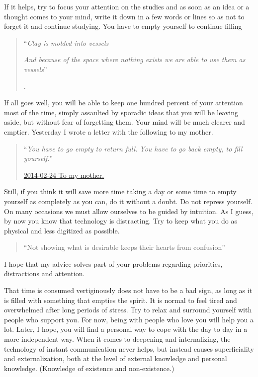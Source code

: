\documentclass[]{book}
\begin{document}
If it helps, try to focus your attention on the studies and as soon as an idea or a thought comes to your mind, write it down in a few words or lines so as not to forget it and continue studying. You have to empty yourself to continue filling

\begin{quote}
``\emph{Clay is molded into vessels}

\emph{And because of the space where nothing exists we are able to use them as vessels}''

\citep{ta1984tao}.
\end{quote}

If all goes well, you will be able to keep one hundred percent of your attention most of the time, simply assaulted by sporadic ideas that you will be leaving aside, but without fear of forgetting them. Your mind will be much clearer and emptier. Yesterday I wrote a letter with the following to my mother.

\begin{quote}
``\emph{You have to go empty to return full. You have to go back empty, to fill yourself.}''

\protect\hyperlink{tomother20140224}{2014-02-24 To my mother.}
\end{quote}

Still, if you think it will save more time taking a day or some time to empty yourself as completely as you can, do it without a doubt. Do not repress yourself. On many occasions we must allow ourselves to be guided by intuition. As I guess, by now you know that technology is distracting. Try to keep what you do as physical and less digitized as possible.

\begin{quote}
``Not showing what is desirable keeps their hearts from confusion''

\citep{ta1984tao}
\end{quote}

I hope that my advice solves part of your problems regarding priorities, distractions and attention.

That time is consumed vertiginously does not have to be a bad sign, as long as it is filled with something that empties the spirit. It is normal to feel tired and overwhelmed after long periods of stress. Try to relax and surround yourself with people who support you. For now, being with people who love you will help you a lot. Later, I hope, you will find a personal way to cope with the day to day in a more independent way. When it comes to deepening and internalizing, the technology of instant communication never helps, but instead causes superficiality and externalization, both at the level of external knowledge and personal knowledge. (Knowledge of existence and non-existence.)
\end{document}
